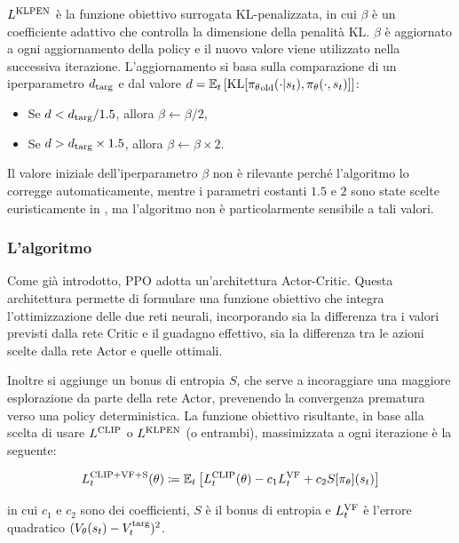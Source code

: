 $L^{\textnormal{KLPEN}}$ è la funzione obiettivo surrogata KL-penalizzata, in cui $\beta$ è un coefficiente adattivo che controlla la dimensione della penalità KL. $\beta$ è aggiornato a ogni aggiornamento della policy e il nuovo valore viene utilizzato nella successiva iterazione. L'aggiornamento si basa sulla comparazione di un iperparametro $d_\textnormal{targ}$ e dal valore $d = \mathbb{E}_t \left[ \textnormal{KL}[{\pi_\theta}_\textnormal{old}(\cdot | s_t), \pi_\theta(\cdot, s_t)] \right]$:

\begin{itemize}
    \item Se $d < d_\textnormal{targ} / 1.5$, allora $\beta \gets \beta / 2$,
    \item Se $d > d_\textnormal{targ} \times 1.5$, allora $\beta \gets \beta \times 2$.
\end{itemize}

Il valore iniziale dell'iperparametro $\beta$ non è rilevante perché l'algoritmo lo corregge automaticamente, mentre i parametri costanti $1.5$ e $2$ sono state scelte euristicamente in \cite{Schulman2017}, ma l'algoritmo non è particolarmente sensibile a tali valori.

\subsubsection{L'algoritmo}

Come già introdotto, PPO adotta un'architettura Actor-Critic. Questa architettura permette di formulare una funzione obiettivo che integra l'ottimizzazione delle due reti neurali, incorporando sia la differenza tra i valori previsti dalla rete Critic e il guadagno effettivo, sia la differenza tra le azioni scelte dalla rete Actor e quelle ottimali.

Inoltre si aggiunge un bonus di entropia $S$, che serve a incoraggiare una maggiore esplorazione da parte della rete Actor, prevenendo la convergenza prematura verso una policy deterministica. La funzione obiettivo risultante, in base alla scelta di usare $L^{\textnormal{CLIP}}$ o $L^{\textnormal{KLPEN}}$ (o entrambi), massimizzata a ogni iterazione è la seguente:

\begin{equation}
    L^{\textnormal{CLIP+VF+S}}_t(\theta) \coloneqq \mathbb{E}_t \left[ L^{\textnormal{CLIP}}_t(\theta) - c_1 L^{\textnormal{VF}}_t + c_2 S[\pi_\theta](s_t) \right]
\end{equation}

in cui $c_1$ e $c_2$ sono dei coefficienti, $S$ è il bonus di entropia e $L^{\textnormal{VF}}_t$ è l'errore quadratico $(V_\theta(s_t) - V^{\textnormal{targ}}_t)^2$.

